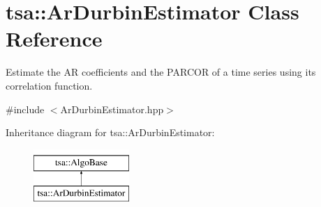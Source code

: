 \hypertarget{classtsa_1_1_ar_durbin_estimator}{}\section{tsa\+:\+:Ar\+Durbin\+Estimator Class Reference}
\label{classtsa_1_1_ar_durbin_estimator}


Estimate the AR coefficients and the P\+A\+R\+C\+OR of a time series using its correlation function.  




{\ttfamily \#include $<$Ar\+Durbin\+Estimator.\+hpp$>$}

Inheritance diagram for tsa\+:\+:Ar\+Durbin\+Estimator\+:\begin{figure}[H]
\begin{center}
\leavevmode
\includegraphics[height=2.000000cm]{classtsa_1_1_ar_durbin_estimator}
\end{center}
\end{figure}

